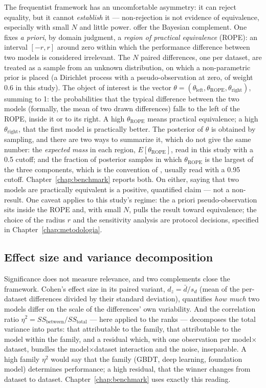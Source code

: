 The frequentist framework has an uncomfortable asymmetry: it can
reject equality, but it cannot \emph{establish} it ---
non-rejection is not evidence of equivalence, especially with small
$N$ and little power. \citet{benavoli2017} offer the Bayesian
complement. One fixes \emph{a priori}, by domain judgment, a
\emph{region of practical equivalence} (ROPE): an interval
$[-r, r]$ around zero within which the performance difference
between two models is considered irrelevant. The $N$ paired
differences, one per dataset, are treated as a sample from an
unknown distribution, on which a non-parametric prior is placed (a
Dirichlet process with a pseudo-observation at zero, of weight 0.6
in this study). The object of interest is the vector
$\theta = (\theta_{\text{left}}, \theta_{\text{ROPE}},
\theta_{\text{right}})$, summing to 1: the probabilities that the
typical difference between the two models (formally, the mean of
two drawn differences) falls to the left of the ROPE, inside it or
to its right. A high $\theta_{\text{ROPE}}$ means practical
equivalence; a high $\theta_{\text{right}}$, that the first model
is practically better. The posterior of $\theta$ is obtained by
sampling, and there are two ways to summarize it, which do not give
the same number: the \emph{expected mass} in each region,
$E[\theta_{\text{ROPE}}]$, read in this study with a 0.5 cutoff;
and the fraction of posterior samples in which
$\theta_{\text{ROPE}}$ is the largest of the three components,
which is the convention of \citet{benavoli2017}, usually read with
a 0.95 cutoff. Chapter~\ref{chap:benchmark} reports both. On
either, saying that two models are practically equivalent is a
positive, quantified claim --- not a non-result. One caveat applies
to this study's regime: the a priori pseudo-observation sits
inside the ROPE and, with small $N$, pulls the result toward
equivalence; the choice of the radius $r$ and the sensitivity
analysis are protocol decisions, specified in
Chapter~\ref{chap:metodologia}.

\subsection{Effect size and variance decomposition}

Significance does not measure relevance, and two complements close
the framework. Cohen's effect size in its paired variant,
$d_z = \bar{d} / s_d$ (mean of the per-dataset differences divided
by their standard deviation), quantifies \emph{how much} two models
differ on the scale of the differences' own variability. And the
correlation ratio
$\eta^2 = \mathit{SS}_{\text{between}} / \mathit{SS}_{\text{total}}$
--- here applied to the ranks --- decomposes the total variance
into parts: that attributable to the family, that attributable to
the model within the family, and a residual which, with one
observation per model$\times$dataset, bundles the
model$\times$dataset interaction and the noise, inseparable. A
high family $\eta^2$ would say that the family (GBDT, deep
learning, foundation model) determines performance; a high
residual, that the winner changes from dataset to dataset.
Chapter~\ref{chap:benchmark} uses exactly this reading.


